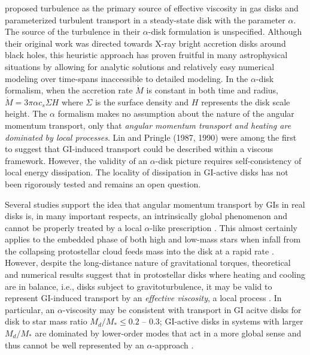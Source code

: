 \documentclass[manuscript]{aastex}
\begin{document}
\citet{shakura1973} proposed turbulence as the primary source of effective viscosity in gas disks
and parameterized turbulent transport in a steady-state disk with the  parameter $\alpha$.  The source of the 
turbulence in their $\alpha$-disk formulation is unspecified. Although their original work was directed towards X-ray bright
accretion disks around black holes, this heuristic approach has proven fruitful in many astrophysical situations by allowing for analytic solutions and relatively easy numerical modeling over time-spans inaccessible to detailed modeling. In the 
$\alpha$-disk formalism, when the accretion rate $\dot{M}$ is constant in both time and radius, $\dot{M} = 3\pi\alpha c_s \Sigma H$ where $\Sigma$ is the surface density and $H$ represents
the disk scale height. The $\alpha$ formalism makes no assumption about the nature of the angular momentum transport, only that {\it angular momentum transport
and heating are dominated by local processes}. Lin and Pringle (1987, 1990) were among the first to suggest
that GI-induced transport could be described within a viscous
framework.  However, the  validity of an $\alpha$-disk picture requires self-consistency of local energy dissipation. 
The locality of dissipation in GI-active disks has not been rigorously tested and remains an open question. 

Several studies support the idea that angular momentum transport by GIs in real disks is, in many important respects, an intrinsically global phenomenon and cannot be properly treated by a local $\alpha$-like prescription \citep{laughlin1996, balbus1999, lodato2005, mejia2005, boley2006, cai2008}.  This almost certainly applies to the embedded phase of both high and low-mass stars when infall from the collapsing protostellar cloud feeds mass into the disk at a rapid
rate \citep[e.g.]{yorke1993, laughlin1994, yorke1999,vorobyov2005,vorobyov2006}.  
However, despite the long-distance nature of gravitational torques, theoretical and numerical results suggest that in protostellar disks where heating and cooling are in balance, i.e., disks subject to gravitoturbulence,
 it may be valid to represent GI-induced transport by an {\it effective viscosity}, a local process \citep{gammie2001, lodato2004, rice2005, cossins2009, vorobyov2010}.  In particular, 
an $\alpha$-viscosity may be consistent
with transport in GI acitve disks for disk to star mass ratio $M_d/M_* \le 0.2$ -- 0.3; GI-active disks
in systems with larger $M_d/M_*$ are dominated by lower-order modes that act in a more global sense and thus cannot be well represented by an $\alpha$-approach
\citep{lodato2004, cossins2009, vorobyov2010}.
\end{document}
